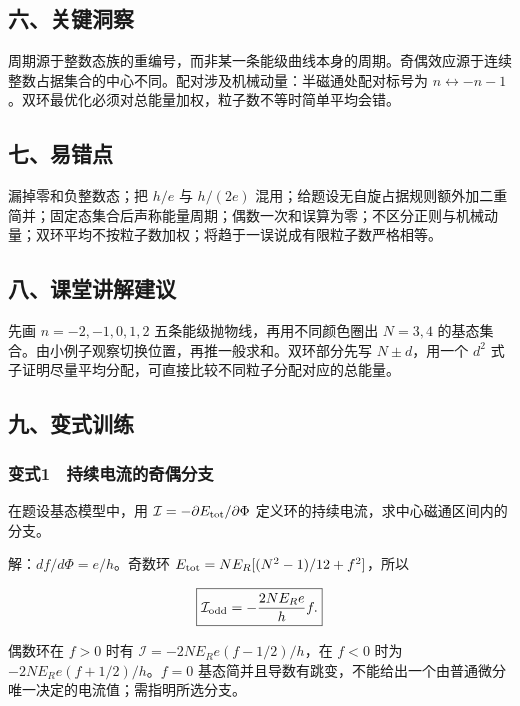 \documentclass[12pt,a4paper,fontset=fandol]{ctexart}
\begin{document}
\subsection{六、关键洞察}\label{ux516dux5173ux952eux6d1eux5bdf-6}

周期源于整数态族的重编号，而非某一条能级曲线本身的周期。奇偶效应源于连续整数占据集合的中心不同。配对涉及机械动量：半磁通处配对标号为
\(n\leftrightarrow-n-1\)。双环最优化必须对总能量加权，粒子数不等时简单平均会错。

\subsection{七、易错点}\label{ux4e03ux6613ux9519ux70b9-6}

漏掉零和负整数态；把 \(h/e\) 与 \(h/(2e)\)
混用；给题设无自旋占据规则额外加二重简并；固定态集合后声称能量周期；偶数一次和误算为零；不区分正则与机械动量；双环平均不按粒子数加权；将趋于一误说成有限粒子数严格相等。

\subsection{八、课堂讲解建议}\label{ux516bux8bfeux5802ux8bb2ux89e3ux5efaux8bae-6}

先画 \(n=-2,-1,0,1,2\) 五条能级抛物线，再用不同颜色圈出 \(N=3,4\)
的基态集合。由小例子观察切换位置，再推一般求和。双环部分先写
\(N\pm d\)，用一个 \(d^2\)
式子证明尽量平均分配，可直接比较不同粒子分配对应的总能量。

\subsection{九、变式训练}\label{ux4e5dux53d8ux5f0fux8badux7ec3-6}

\subsubsection{变式1　持续电流的奇偶分支}\label{ux53d8ux5f0f1-ux6301ux7eedux7535ux6d41ux7684ux5947ux5076ux5206ux652f}

在题设基态模型中，用 \(\mathcal I=-\partial E_{\rm tot}/\partial\Phi\)
定义环的持续电流，求中心磁通区间内的分支。

解：\(df/d\Phi=e/h\)。奇数环 \(E_{\rm tot}=NE_R[(N^2-1)/12+f^2]\)，所以

\[\boxed{\mathcal I_{\rm odd}=-\frac{2NE_Re}{h}f.}\]

偶数环在 \(f>0\) 时有 \(\mathcal I=-2NE_Re(f-1/2)/h\)，在 \(f<0\) 时为
\(-2NE_Re(f+1/2)/h\)。\(f=0\)
基态简并且导数有跳变，不能给出一个由普通微分唯一决定的电流值；需指明所选分支。
\end{document}

